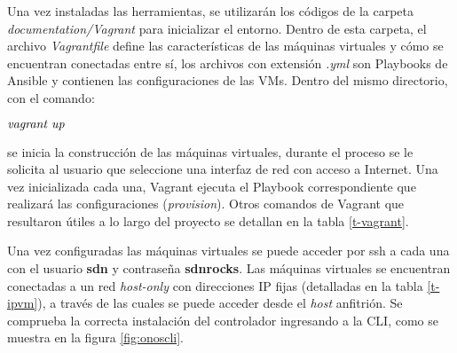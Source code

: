 Una vez instaladas las herramientas, se utilizarán los códigos de la carpeta \textit{documentation/Vagrant} para inicializar el entorno. Dentro de esta carpeta, el archivo \textit{Vagrantfile} define las características de las máquinas virtuales y cómo se encuentran conectadas entre sí, los archivos con extensión \textit{.yml} son Playbooks de Ansible y contienen las configuraciones de las VMs. Dentro del mismo directorio, con el comando:
\begin{center}
    $ \emph {vagrant up}$
\end{center}
se inicia la construcción de las máquinas virtuales, durante el proceso se le solicita al usuario que seleccione una interfaz de red con acceso a Internet. Una vez inicializada cada una, Vagrant ejecuta el Playbook correspondiente que realizará las configuraciones (\textit{provision}). Otros comandos de Vagrant que resultaron útiles a lo largo del proyecto se detallan en la tabla \ref{t-vagrant}.

\begin{table}[th]
    \centering
    \caption{Comandos de Vagrant frecuentemente utilizados}
    \label{t-vagrant}
\end{table}

Una vez configuradas las máquinas virtuales se puede acceder por ssh a cada una con el usuario \textbf{sdn} y contraseña \textbf{sdnrocks}. Las máquinas virtuales se encuentran conectadas a un red \textit{host-only} con direcciones IP fijas (detalladas en la tabla \ref{t-ipvm}), a través de las cuales se puede acceder desde el \textit{host} anfitrión. Se comprueba la correcta instalación del controlador ingresando a la CLI, como se muestra en la figura \ref{fig:onoscli}.

